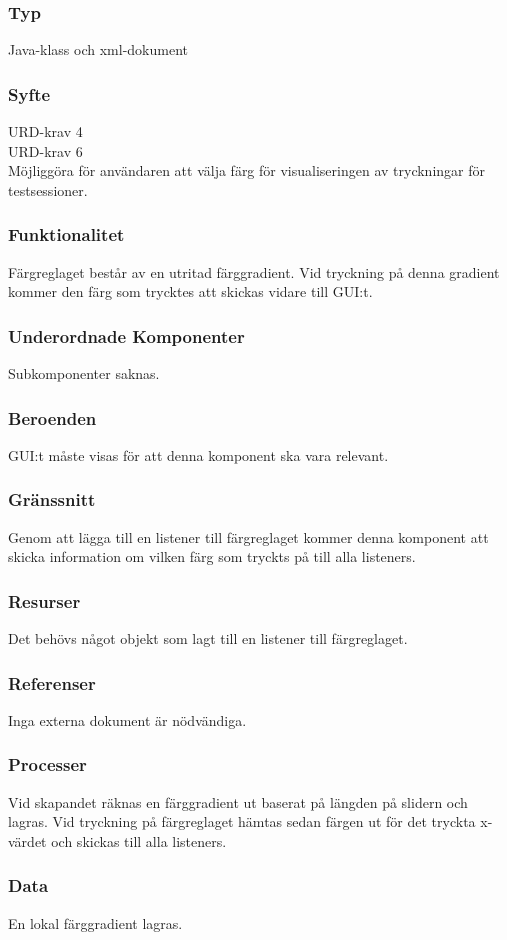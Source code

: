 \subsubsection{Typ}
Java-klass och xml-dokument

\subsubsection{Syfte}
URD-krav 4 \\
URD-krav 6 \\
Möjliggöra för användaren att välja färg för visualiseringen av tryckningar för testsessioner.

\subsubsection{Funktionalitet}
Färgreglaget består av en utritad färggradient. Vid tryckning på denna gradient kommer den färg som trycktes att skickas vidare till GUI:t.

\subsubsection{Underordnade Komponenter}
Subkomponenter saknas.

\subsubsection{Beroenden}
GUI:t måste visas för att denna komponent ska vara relevant.

\subsubsection{Gränssnitt}
Genom att lägga till en listener till färgreglaget kommer denna komponent att skicka information om vilken färg som tryckts på till alla listeners. 

\subsubsection{Resurser}
Det behövs något objekt som lagt till en listener till färgreglaget.

\subsubsection{Referenser}
Inga externa dokument är nödvändiga.

\subsubsection{Processer}
Vid skapandet räknas en färggradient ut baserat på längden på slidern och lagras. Vid tryckning på färgreglaget hämtas sedan färgen ut för det tryckta x-värdet och skickas till alla listeners.

\subsubsection{Data}
En lokal färggradient lagras.